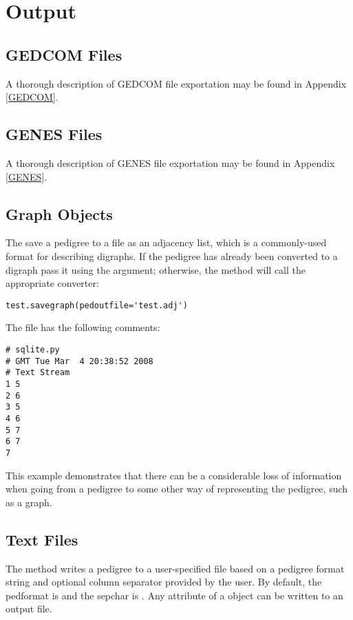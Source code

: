 \section{Output}\label{sec:io-output}
\subsection{{GEDCOM} Files}\label{sec:io-output-gedcom}
A thorough description of {GEDCOM} file exportation may be found in Appendix \ref{GEDCOM}.

\subsection{{GENES} Files}\label{sec:io-output-genes}
A thorough description of {GENES} file exportation may be found in Appendix \ref{GENES}.

\subsection{Graph Objects}\label{sec:io-output-xdigraph}
The  save a pedigree to a file as an adjacency list, which is a commonly-used format for describing digraphs. If the pedigree has already been converted to a digraph pass it using the  argument; otherwise, the method will call the appropriate converter:
\begin{verbatim}
test.savegraph(pedoutfile='test.adj')
\end{verbatim}
The file  has the following comments:
\begin{verbatim}
# sqlite.py
# GMT Tue Mar  4 20:38:52 2008
# Text Stream
1 5
2 6
3 5
4 6
5 7
6 7
7
\end{verbatim}
This example demonstrates that there can be a considerable loss of information when going from a \PyPedal{} pedigree to some other way of representing the pedigree, such as a graph.

\subsection{Text Files}\label{sec:io-output-text-files}
The  method writes a \PyPedal{} pedigree to a user-specified file based on a pedigree format string and optional column separator provided by the user. By default, the pedformat is  and the sepchar is \samp{ }. Any attribute of a  object can be written to an output file.


